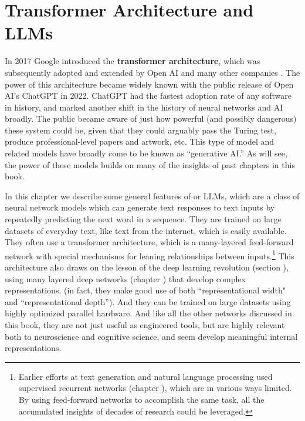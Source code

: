\chapter{Transformer Architecture and LLMs}\label{ch_transformers}

%
In 2017 Google introduced the \textbf{transformer architecture}, which was subsequently adopted and extended by Open AI and many other companies \cite{vaswani2017attention}. The power of this architecture became widely known with the public release of Open AI's ChatGPT in 2022. ChatGPT had the fastest adoption rate of any software in history, and  marked another shift in the history of neural networks and AI broadly. The public became aware of just how powerful (and possibly dangerous) these system could be, given that they could arguably pass the Turing test, produce professional-level papers and artwork, etc. This type of model and related models have broadly come to be known as ``generative AI.'' As will see, the power of these models builds on many of the insights of past chapters in this book. 

In this chapter we describe some general features of   or LLMs, which are a class of neural network models which can generate text responses to text inputs by repeatedly predicting the next word in a sequence. They are trained on large datasets of everyday text, like text from the internet, which is easily available. They often use a transformer architecture, which is a many-layered feed-forward network with special mechanisms for leaning relationships between inputs.\footnote{Earlier efforts at text generation and natural language processing used supervised recurrent networks (chapter ), which are in various ways limited. By using feed-forward networks to accomplish the same task, all the accumulated insights of decades of research could be leveraged.} 
This architecture also draws on the lesson of the deep learning revolution (section ), using many layered deep networks (chapter ) that develop complex representations. (in fact, they make good use of both ``representational width" and ``representational depth''). And they can be trained on large datasets using highly optimized parallel hardware.  And like all the other networks discussed in this book, they are not just useful as engineered tools, but are highly relevant both to neuroscience and cognitive science, and seem develop meaningful internal representations. 

